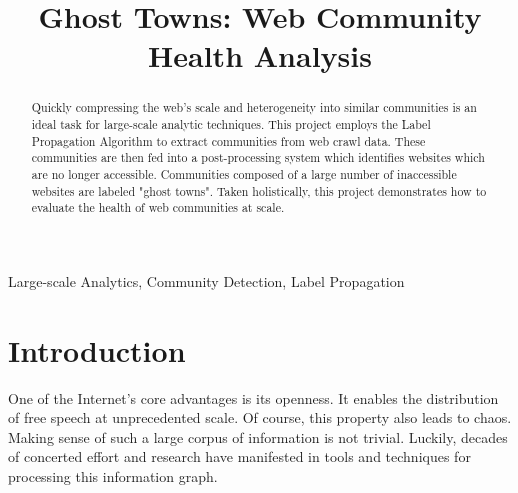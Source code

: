 \documentclass[conference]{IEEEtran}
\begin{document}
\title{Ghost Towns: Web Community Health Analysis}

\author{
\and
{}
\and
{}
}

\maketitle

\begin{abstract}
Quickly compressing the web's scale and heterogeneity into similar communities is an ideal task for large-scale analytic techniques. This project employs the Label Propagation Algorithm to extract communities from web crawl data. These communities are then fed into a post-processing system which identifies websites which are no longer accessible. Communities composed of a large number of inaccessible websites are labeled "ghost towns". Taken holistically, this project demonstrates how to evaluate the health of web communities at scale.
\end{abstract}

\begin{IEEEkeywords}
Large-scale Analytics, Community Detection, Label Propagation
\end{IEEEkeywords}

\section{Introduction}

One of the Internet's core advantages is its openness. It enables the distribution of free speech at unprecedented scale. Of course, this property also leads to chaos. Making sense of such a large corpus of information is not trivial. Luckily, decades of concerted effort and research have manifested in tools and techniques for processing this information graph.
\end{document}
